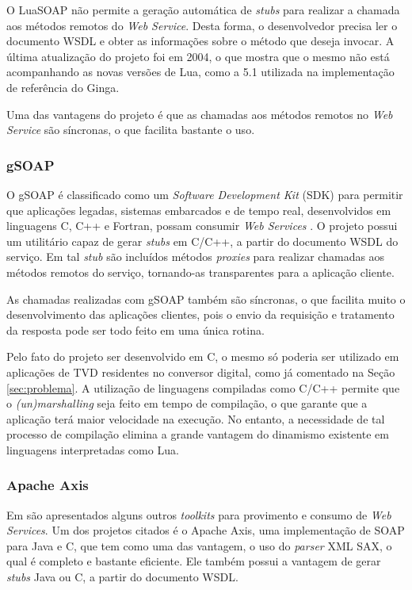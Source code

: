 O LuaSOAP não permite a geração automática de \textit{stubs} para realizar a chamada aos métodos remotos do \textit{Web Service}.
Desta forma, o desenvolvedor precisa ler o documento WSDL e obter as informações sobre o método que deseja invocar.
A última atualização do projeto foi em 2004, o que mostra que o mesmo não está acompanhando as novas
versões de Lua, como a 5.1 utilizada na implementação de referência do Ginga.

Uma das vantagens do projeto é que as chamadas aos métodos remotos no \textit{Web Service} são síncronas, o que facilita
bastante o uso.

\subsubsection{gSOAP}

O gSOAP é classificado como um \textit{Software Development Kit} (SDK) para permitir que aplicações legadas, sistemas embarcados e de tempo real, desenvolvidos em linguagens C, C++ e Fortran, possam consumir \textit{Web Services} \cite{van2005gsoap}. O projeto possui um utilitário capaz de gerar \textit{stubs} em C/C++, a partir do documento WSDL do serviço. Em tal \textit{stub} são incluídos métodos \textit{proxies} para realizar chamadas aos métodos remotos do serviço, tornando-as transparentes para a aplicação cliente.

As chamadas realizadas com gSOAP também são síncronas, o que facilita muito o desenvolvimento das aplicações clientes,
pois o envio da requisição e tratamento da resposta pode ser todo feito em uma única rotina.

Pelo fato do projeto ser desenvolvido em C, o mesmo só poderia ser utilizado
em aplicações de TVD residentes no conversor digital, como já comentado na Seção \ref{sec:problema}.
A utilização de linguagens compiladas como C/C++ permite que o \textit{(un)marshalling} 
seja feito em tempo de compilação, o que garante que a aplicação terá maior velocidade 
na execução. No entanto, a necessidade de tal processo de compilação elimina
a grande vantagem do dinamismo existente em linguagens interpretadas como Lua.

\subsubsection{Apache Axis}

Em \cite{davis2005latency} são apresentados alguns outros \textit{toolkits} para provimento e consumo de \textit{Web Services}. Um dos projetos citados é o Apache Axis, uma implementação de SOAP para Java e C, que tem como uma das vantagem, o uso do \textit{parser} XML SAX, o qual é completo e bastante eficiente. Ele também possui a vantagem de gerar \textit{stubs} Java ou C, a partir do documento WSDL.

